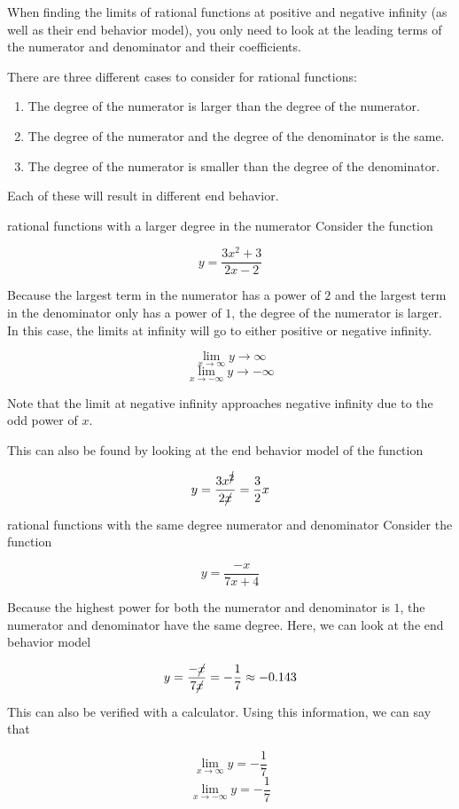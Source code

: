 When finding the limits of rational functions at positive and negative infinity (as well as their end behavior model), you only need to look at the leading terms of the numerator and denominator and their coefficients.

There are three different cases to consider for rational functions:

\begin{enumerate}
    \item The degree of the numerator is larger than the degree of the numerator.
    \item The degree of the numerator and the degree of the denominator is the same.
    \item The degree of the numerator is smaller than the degree of the denominator.
\end{enumerate}

Each of these will result in different end behavior.

\begin{example}{rational functions with a larger degree in the numerator}
    Consider the function
    
    \[ y = \dfrac{3x^2 + 3}{2x - 2} \]
    
    Because the largest term in the numerator has a power of \( 2 \) and the largest term in the denominator only has a power of \( 1 \), the degree of the numerator is larger. In this case, the limits at infinity will go to either positive or negative infinity.
    
    \[ \lim_{x \to \infty} y \to \infty \]
    \[ \lim_{x \to -\infty} y \to -\infty \]
    
    Note that the limit at negative infinity approaches negative infinity due to the odd power of \( x \).
    
    This can also be found by looking at the end behavior model of the function
    
    \[ y = \dfrac{3x^{\cancel{2}}}{2\cancel{x}} = \dfrac{3}{2}x \]
\end{example}

\begin{example}{rational functions with the same degree numerator and denominator}
    Consider the function
    
    \[ y = \dfrac{-x}{7x + 4} \]
    
    Because the highest power for both the numerator and denominator is \( 1 \), the numerator and denominator have the same degree. Here, we can look at the end behavior model
    
    \[ y = \dfrac{-\cancel{x}}{7\cancel{x}} = -\dfrac{1}{7} \approx -0.143 \]
    
    This can also be verified with a calculator. Using this information, we can say that
    
    \[ \lim_{x \to \infty} y = -\dfrac{1}{7} \]
    \[ \lim_{x \to -\infty} y = -\dfrac{1}{7} \]
\end{example}

